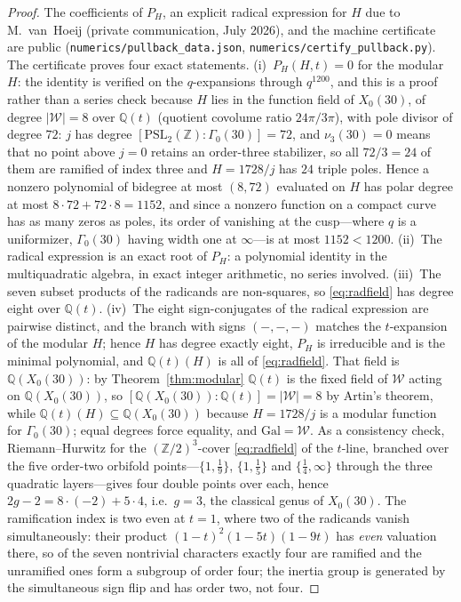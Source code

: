 \documentclass[11pt]{article}
\theoremstyle{plain}
\theoremstyle{remark}
\begin{document}
\begin{proof}
The coefficients of $P_H$, an explicit radical expression for $H$ due to
M.~van~Hoeij (private communication, July 2026), and the machine certificate are public
(\texttt{numerics/\allowbreak pullback\_\allowbreak data.json},
\texttt{numerics/\allowbreak certify\_\allowbreak pullback.py}). The certificate proves four
exact statements. (i)~$P_H(H,t)=0$ for the modular $H$: the identity is verified on the $q$-expansions
through $q^{1200}$, and this is a proof rather than a series check because $H$ lies in the function field of
$X_0(30)$, of degree $|\mathcal{W}|=8$ over $\mathbb{Q}(t)$ (quotient covolume ratio $24\pi/3\pi$), with pole
divisor of degree $72$: $j$ has degree $[\mathrm{PSL}_2(\mathbb{Z}):\Gamma_0(30)]=72$, and $\nu_3(30)=0$ means
that no point above $j=0$ retains an order-three stabilizer, so all $72/3=24$ of them are ramified of index
three and $H=1728/j$ has $24$ triple poles. Hence a nonzero polynomial of bidegree at most $(8,72)$ evaluated
on $H$ has polar degree at most $8\cdot72+72\cdot8=1152$, and since a nonzero function on a compact curve has
as many zeros as poles, its order of vanishing at the cusp---where $q$ is a uniformizer, $\Gamma_0(30)$ having
width one at $\infty$---is at most $1152<1200$. (ii)~The radical expression is an exact root of
$P_H$: a polynomial identity in the multiquadratic algebra, in exact integer arithmetic, no series involved.
(iii)~The seven subset products of the radicands are non-squares, so \eqref{eq:radfield} has degree eight
over $\mathbb{Q}(t)$. (iv)~The eight sign-conjugates of the radical expression are pairwise distinct, and the
branch with signs $(-,-,-)$ matches the $t$-expansion of the modular $H$; hence $H$ has degree exactly eight,
$P_H$ is irreducible and is the minimal polynomial, and $\mathbb{Q}(t)(H)$ is all of \eqref{eq:radfield}.
That field is $\mathbb{Q}(X_0(30))$: by Theorem~\ref{thm:modular} $\mathbb{Q}(t)$ is the fixed field of
$\mathcal{W}$ acting on $\mathbb{Q}(X_0(30))$, so $[\mathbb{Q}(X_0(30)):\mathbb{Q}(t)]=|\mathcal{W}|=8$ by
Artin's theorem, while $\mathbb{Q}(t)(H)\subseteq\mathbb{Q}(X_0(30))$ because $H=1728/j$ is a modular function
for $\Gamma_0(30)$; equal degrees force equality, and $\mathrm{Gal}=\mathcal{W}$. As a consistency check,
Riemann--Hurwitz for the $(\mathbb{Z}/2)^3$-cover \eqref{eq:radfield} of the $t$-line, branched over the five
order-two orbifold points---$\{1,\tfrac19\}$, $\{1,\tfrac15\}$ and $\{\tfrac14,\infty\}$ through the three
quadratic layers---gives four double points over each, hence $2g-2=8\cdot(-2)+5\cdot4$, i.e.\ $g=3$, the
classical genus of $X_0(30)$. The ramification index is two even at $t=1$, where two of the radicands vanish
simultaneously: their product $(1-t)^2(1-5t)(1-9t)$ has \emph{even} valuation there, so of the seven nontrivial
characters exactly four are ramified and the unramified ones form a subgroup of order four; the inertia group is
generated by the simultaneous sign flip and has order two, not four.
\end{proof}
\end{document}
